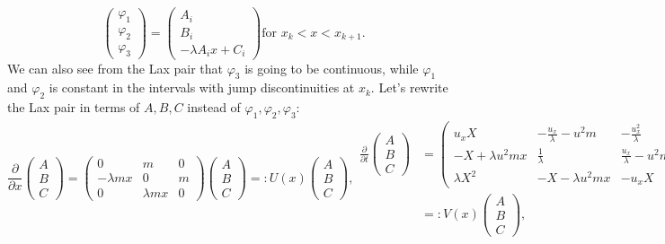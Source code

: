 \documentclass[english,master]{liumaiex}
\theoremstyle{plain}
\theoremstyle{definition}
\begin{document}
\begin{equation}
\begin{pmatrix} \varphi_1 \\ \varphi_2 \\ \varphi_3 \end{pmatrix} =
\begin{pmatrix} A_i \\ B_i \\ -\lambda A_i x + C_i \end{pmatrix} 
\text{for } x_k < x < x_{k+1}.
\end{equation}
We can also see from the Lax pair that $\varphi_3$ is going to be continuous, while $\varphi_1$ and $\varphi_2$ is constant in the intervals with jump discontinuities at $x_k$. Let's rewrite the Lax pair in terms of $A, B, C$ instead of $\varphi_1, \varphi_2, \varphi_3$:
\begin{subequations}
  \begin{equation}
    \frac{\partial}{\partial x}
    \begin{pmatrix} A \\ B \\ C \end{pmatrix} =
    \begin{pmatrix}
      0 & m & 0 \\
      -\lambda m x & 0 & m \\
      0 & \lambda m x & 0
    \end{pmatrix}
    \begin{pmatrix} A \\ B \\ C \end{pmatrix}
	=: U(x) \begin{pmatrix} A \\ B \\ C \end{pmatrix}
    ,
  \end{equation}
  \begin{align}
    \frac{\partial}{\partial t}
    \begin{pmatrix} A \\ B \\ C \end{pmatrix} &=
    \begin{pmatrix}
      u_x X & -\frac{u_x}{\lambda} -u^2 m & -\frac{u_x^2}{\lambda} \\
      -X + \lambda u^2 m x & \frac{1}{\lambda} & \frac{u_x}{\lambda} - u^2 m \\
      \lambda X^2 & -X - \lambda u^2 m x & -u_x X
    \end{pmatrix}
    \begin{pmatrix} A \\ B \\ C \end{pmatrix} \\
	&=: V(x) \begin{pmatrix} A \\ B \\ C \end{pmatrix}
    ,
  \end{align}
\end{subequations}
\end{document}
